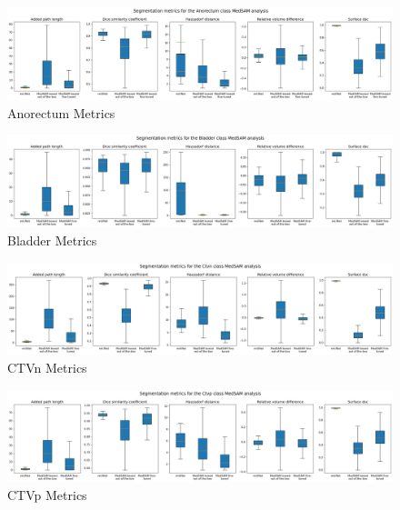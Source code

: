 \documentclass[12pt,twoside]{report}
\begin{document}
\begin{landscape}

  \begin{figure}[H]
    \centering
    \includegraphics[width=\linewidth]{../../research/source/code/data/metrics/metricsanorectum_1_combinednotable_MedSAM_analysis.png}
    \caption{Anorectum Metrics}\label{fig:medsam-metrics-anorectum}
  \end{figure}

  \begin{figure}[H]
    \centering
    \includegraphics[width=\linewidth]{../../research/source/code/data/metrics/metricsbladder_1_combinednotable_MedSAM_analysis.png}
    \caption{Bladder Metrics}\label{fig:medsam-metrics-bladder}
  \end{figure}

  \begin{figure}[H]
    \centering
    \includegraphics[width=\linewidth]{../../research/source/code/data/metrics/metricsctvn_1_combinednotable_MedSAM_analysis.png}
    \caption{CTVn Metrics}\label{fig:medsam-metrics-ctvn}
  \end{figure}

  \begin{figure}[H]
    \centering
    \includegraphics[width=\linewidth]{../../research/source/code/data/metrics/metricsctvp_1_combinednotable_MedSAM_analysis.png}
    \caption{CTVp Metrics}\label{fig:medsam-metrics-ctvp}
  \end{figure}


\end{landscape}
\end{document}
